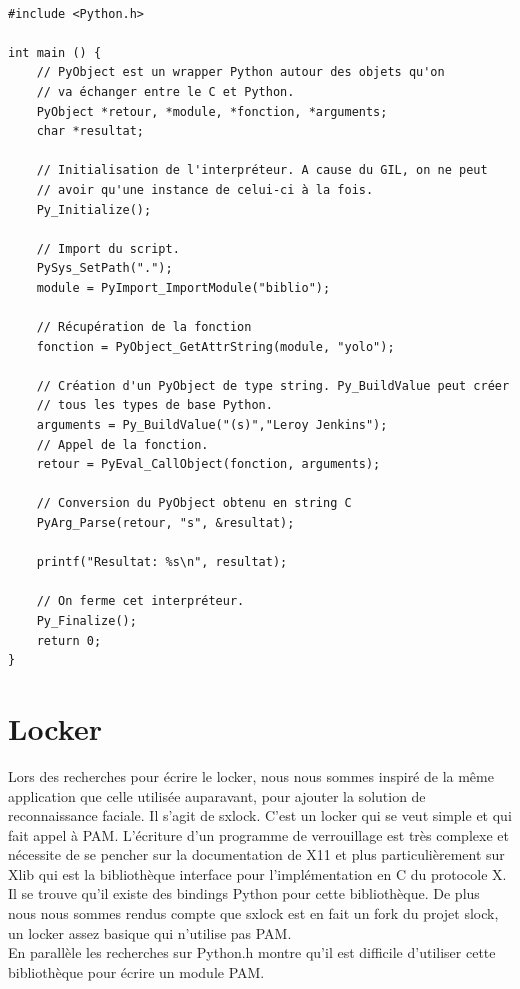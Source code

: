 \documentclass{article}
\begin{document}
  \begin{verbatim}

#include <Python.h>

int main () {
    // PyObject est un wrapper Python autour des objets qu'on
    // va échanger entre le C et Python.
    PyObject *retour, *module, *fonction, *arguments;
    char *resultat;

    // Initialisation de l'interpréteur. A cause du GIL, on ne peut
    // avoir qu'une instance de celui-ci à la fois.
    Py_Initialize();

    // Import du script.
    PySys_SetPath(".");
    module = PyImport_ImportModule("biblio");

    // Récupération de la fonction
    fonction = PyObject_GetAttrString(module, "yolo");

    // Création d'un PyObject de type string. Py_BuildValue peut créer
    // tous les types de base Python.
    arguments = Py_BuildValue("(s)","Leroy Jenkins");
    // Appel de la fonction.
    retour = PyEval_CallObject(fonction, arguments);

    // Conversion du PyObject obtenu en string C
    PyArg_Parse(retour, "s", &resultat);

    printf("Resultat: %s\n", resultat);

    // On ferme cet interpréteur.
    Py_Finalize();
    return 0;
}
  \end{verbatim}

  \section{Locker}

  Lors des recherches pour écrire le locker, nous nous sommes inspiré de la même
  application que celle utilisée auparavant, pour ajouter la solution de
  reconnaissance faciale. Il s’agit de sxlock. C’est un locker qui se
  veut simple et qui fait appel à PAM. L’écriture d’un programme de
  verrouillage est très complexe et nécessite de se pencher sur la
  documentation de X11 et plus particulièrement sur Xlib qui est la
  bibliothèque interface pour l’implémentation en C du protocole X. Il se
  trouve qu’il existe des bindings Python pour cette bibliothèque. De plus nous
  nous sommes rendus compte que sxlock est en fait un fork du projet slock, un
  locker assez basique qui n’utilise pas PAM.
\\
  En parallèle les recherches sur Python.h montre qu’il est difficile
  d’utiliser cette bibliothèque pour écrire un module PAM.
\end{document}
